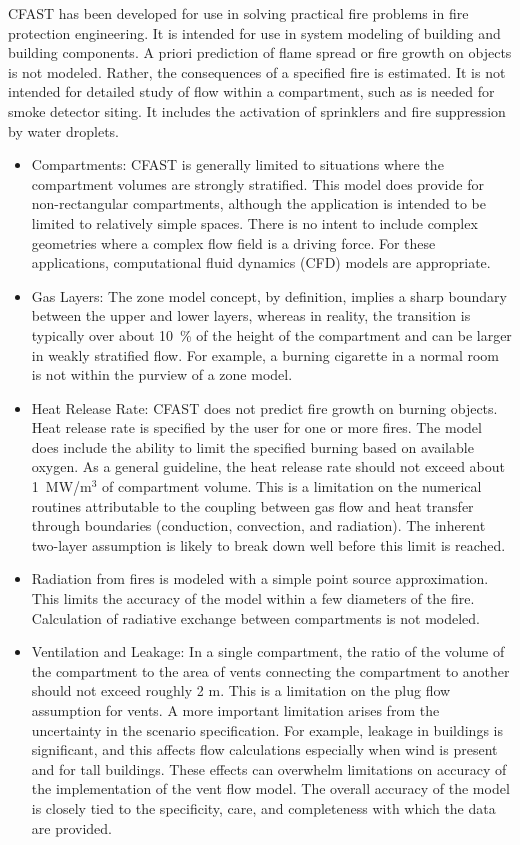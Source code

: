 CFAST has been developed for use in solving practical fire problems in fire protection engineering.  It is intended for use in system modeling of building and building components.  A priori prediction of flame spread or fire growth on objects is not modeled. Rather, the consequences of a specified fire is estimated. It is not intended for detailed study of flow within a compartment, such as is needed for smoke detector siting.  It includes the activation of sprinklers and fire suppression by water droplets.

\begin{itemize}
\item Compartments: CFAST is generally limited to situations where the compartment volumes are strongly stratified.  This model does provide for non-rectangular compartments, although the application is intended to be limited to relatively simple spaces.  There is no intent to include complex geometries where a complex flow field is a driving force.  For these applications, computational fluid dynamics (CFD) models are appropriate.
\item Gas Layers:  The zone model concept, by definition, implies a sharp boundary between the upper and lower layers, whereas in reality, the transition is typically over about 10~\% of the height of the compartment and can be larger in weakly stratified flow.  For example, a burning cigarette in a normal room is not within the purview of a zone model.
\item Heat Release Rate: CFAST does not predict fire growth on burning objects. Heat release rate is specified by the user for one or more fires. The model does include the ability to limit the specified burning based on available oxygen. As a general guideline, the heat release rate should not exceed about 1~MW/m$^3$ of compartment volume.  This is a limitation on the numerical routines attributable to the coupling between gas flow and heat transfer through boundaries (conduction, convection, and radiation).  The inherent two-layer assumption is likely to break down well before this limit is reached.
\item Radiation from fires is modeled with a simple point source approximation.  This limits the accuracy of the model within a few diameters of the fire. Calculation of radiative exchange between compartments is not modeled.
\item Ventilation and Leakage:  In a single compartment, the ratio of the volume of the compartment to the area of vents connecting the compartment to another should not exceed roughly 2 m.  This is a limitation on the plug flow assumption for vents.  A more important limitation arises from the uncertainty in the scenario specification.  For example, leakage in buildings is significant, and this affects flow calculations especially when wind is present and for tall buildings.  These effects can overwhelm limitations on accuracy of the implementation of the vent flow model.  The overall accuracy of the model is closely tied to the specificity, care, and completeness with which the data are provided.

\end{itemize}
